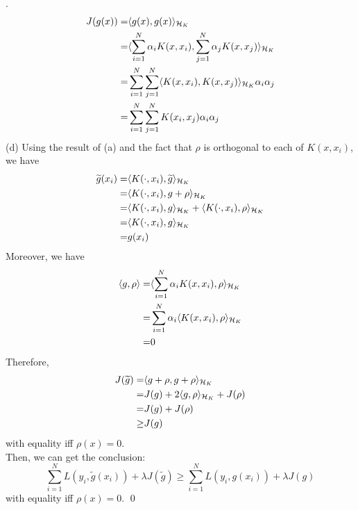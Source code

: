 \documentclass[12pt]{article}
\newenvironment{sol}
  {\par\vspace{3mm}\noindent{\it Solution}.}
  {\qed}
\begin{document}
\begin{sol}
\begin{equation*}
\begin{split}
J(g(x))=&\langle g(x),g(x)\rangle_{\mathcal{H}_K}\\
=&\langle\sum_{i=1}^N\alpha_iK(x,x_i),\sum_{j=1}^N\alpha_jK(x,x_j)\rangle_{\mathcal{H}_K}\\
=&\sum_{i=1}^N\sum_{j=1}^N\langle K(x,x_i),K(x,x_j)\rangle_{\mathcal{H}_K}\alpha_i\alpha_j\\
=&\sum_{i=1}^N\sum_{j=1}^NK(x_i,x_j)\alpha_i\alpha_j\\
\end{split}
\end{equation*}
(d) 
Using the result of (a) and the fact that $\rho$ is orthogonal to each of $K(x,x_i)$, we have
\begin{equation*}
\begin{split}
\widetilde{g}(x_i)=&\langle K(\cdot,x_i),\widetilde{g}\rangle_{\mathcal{H}_K}\\
=&\langle K(\cdot,x_i),g+\rho\rangle_{\mathcal{H}_K}\\
=&\langle K(\cdot,x_i),g\rangle_{\mathcal{H}_K}+\langle K(\cdot,x_i),\rho\rangle_{\mathcal{H}_K}\\
=&\langle K(\cdot,x_i),g\rangle_{\mathcal{H}_K}\\
=&g(x_i)\\
\end{split}
\end{equation*}
Moreover, we have
\begin{equation*}
\begin{split}
\langle g,\rho\rangle=&\langle\sum_{i=1}^N\alpha_iK(x,x_i),\rho\rangle_{\mathcal{H}_K}\\
=&\sum_{i=1}^N\alpha_i\langle K(x,x_i),\rho\rangle_{\mathcal{H}_K}\\
=&0\\
\end{split}
\end{equation*}
Therefore,
\begin{equation*}
\begin{split}
J{(\widetilde{g})}=&\langle g+\rho,g+\rho\rangle_{\mathcal{H}_K}\\
=&J(g)+2\langle g,\rho\rangle_{\mathcal{H}_K}+J(\rho)\\
=&J(g)+J(\rho)\\
\geq &J(g)\\
\end{split}
\end{equation*}
with equality iff $\rho(x)=0$.\\
Then, we can get the conclusion:
$$\sum_{i=1}^NL(y_i,\widetilde{g}(x_i))+\lambda J(\widetilde{g})\geq\sum_{i=1}^NL(y_i,g(x_i))+\lambda J(g)$$
with equality iff $\rho(x)=0$.
\end{sol}
\end{document}
